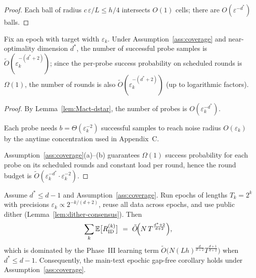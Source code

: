\begin{proof}
Each ball of radius $c\,\varepsilon/L\le h/4$ intersects $O(1)$ cells; there are $O(\varepsilon^{-d^{*}})$ balls.
\end{proof}

\begin{proposition}
\label{prop:per-epoch-coverage}
Fix an epoch with target width $\varepsilon_k$. Under Assumption~\ref{ass:coverage} and near-optimality dimension $d^{*}$, the number of successful probe  {samples} is $\tilde O(\varepsilon_k^{-(d^{*}+2)})$; since the per-probe success probability on scheduled rounds is $\Omega(1)$, the number of  {rounds} is also $\tilde O(\varepsilon_k^{-(d^{*}+2)})$ (up to logarithmic factors).
\end{proposition}

\begin{proof}
By Lemma~\ref{lem:Mact-dstar}, the number of probes is $O(\varepsilon_k^{-d^{*}})$. 

Each probe needs $b=\Theta(\varepsilon_k^{-2})$ successful samples to reach noise radius $O(\varepsilon_k)$ by the anytime concentration used in Appendix~C. 

Assumption~\ref{ass:coverage}(a)--(b) guarantees $\Omega(1)$ success probability for each probe on its scheduled rounds and constant load per round, hence the round budget is $\tilde O(\varepsilon_k^{-d^{*}}\cdot \varepsilon_k^{-2})$.
\end{proof}

\begin{theorem}
\label{thm:conditional-epochic}
Assume $d^{*}\le d-1$ and Assumption~\ref{ass:coverage}. Run epochs of lengths $T_k=2^k$ with precisions $\varepsilon_k\propto 2^{-k/(d+2)}$, reuse all data across epochs, and use public dither (Lemma~\ref{lem:dither-consensus}). Then
\[
\sum_{k} \mathbb{E}\big[R_{\mathrm{ID}}^{(k)}\big]\ =\ \tilde O\!\Big(N\,T^{\frac{d^{*}+2}{d+2}}\Big),
\]
which is dominated by the Phase~III learning term $\tilde O\!\big(N(Lh)^{\frac{d}{d+2}}T^{\frac{d+1}{d+2}}\big)$ when $d^{*}\le d-1$. Consequently, the main-text epochic gap-free corollary holds under Assumption~\ref{ass:coverage}.
\end{theorem}

